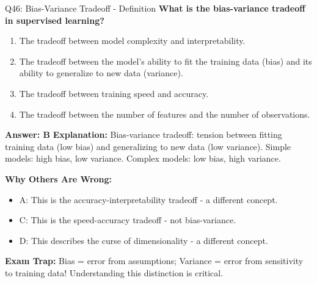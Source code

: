 \documentclass[8pt]{beamer}
\begin{document}
	\begin{frame}{Q46: Bias-Variance Tradeoff - Definition}
		\fontsize{6.5}{7.5}\selectfont
		\textbf{What is the bias-variance tradeoff in supervised learning?}
		
		\begin{enumerate}
			\item The tradeoff between model complexity and interpretability.
			\item The tradeoff between the model's ability to fit the training data (bias) and its ability to generalize to new data (variance).
			\item The tradeoff between training speed and accuracy.
			\item The tradeoff between the number of features and the number of observations.
		\end{enumerate}
		
		\vspace{0.05cm}
		\textcolor{myblue}{\textbf{Answer: B}}
		\vspace{0.05cm}
		\textcolor{myblue}{\textbf{Explanation:}} Bias-variance tradeoff: tension between fitting training data (low bias) and generalizing to new data (low variance). Simple models: high bias, low variance. Complex models: low bias, high variance.
		
		\vspace{0.05cm}
		\textcolor{myred}{\textbf{Why Others Are Wrong:}}
		\begin{itemize}
			\item \textcolor{myred}{A:} This is the accuracy-interpretability tradeoff - a different concept.
			\item \textcolor{myred}{C:} This is the speed-accuracy tradeoff - not bias-variance.
			\item \textcolor{myred}{D:} This describes the curse of dimensionality - a different concept.
		\end{itemize}
		
		\textcolor{myred}{\textbf{Exam Trap:}} Bias = \textcolor{myblue}{error from assumptions}; Variance = \textcolor{myblue}{error from sensitivity to training data}! Understanding this distinction is critical.
	\end{frame}
	
\end{document}
